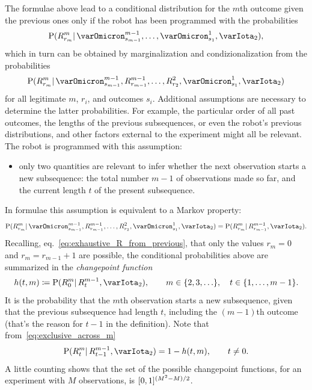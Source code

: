 \documentclass[\ifafour a4paper,12pt,\else a5paper,10pt,\fi%
onecolumn,oneside,article,%
british%
]{memoir}
\theoremstyle{remark}
\theoremstyle{innote}
\newcommand*{\defd}{\coloneqq}
\DeclarePairedDelimiter\clcl{[}{]}
\DeclarePairedDelimiter\set{\{}{\}}
\newcommand*{\p}{\mathrm{P}}%
\renewcommand*{\|}{\mathpunct{|}}
\newcommand*{\eqn}{eq.}%
\newcommand*{\yI}{\varIota}
\newcommand*{\yMc}{\yI_2}
\newcommand*{\yrs}{h}
\begin{document}
The formulae above lead to a conditional distribution for the $m$th outcome
given the previous ones only if the robot has been programmed with the
probabilities
\begin{equation}
  \label{eq:prob_R_conditional_only_data_before}
  \p(R^{m}_{r_{m}} \| \varOmicron^{m-1}_{s_{m-1}},\dotsc, \varOmicron^{1}_{s_{1}}, \yMc),
\end{equation}
which in turn can be obtained by marginalization and condizionalization
from the probabilities
\begin{equation}
  \label{eq:prob_R_conditional_before}
  \p(R^{m}_{r_{m}} \| \varOmicron^{m-1}_{s_{m-1}}, R^{m-1}_{r_{m-1}},\dotsc,
  R^{2}_{r_{2}}, \varOmicron^{1}_{s_{1}}, \yMc)
\end{equation}
for all legitimate $m$, $r_i$, and outcomes $s_i$. Additional assumptions
are necessary to determine the latter probabilities. For example, the
particular order of all past outcomes, the lengths of the previous
subsequences, or even the robot's previous distributions, and other factors
external to the experiment might all be relevant. The robot is programmed
with this assumption:
\begin{itemize}
\item only two quantities are relevant to infer whether the next
  observation starts a new subsequence: the total number $m-1$ of
  observations made so far, and the current length $t$ of the present
  subsequence.
\end{itemize}
In formulae this assumption is equivalent to a Markov property:
\begin{equation}
  \label{eq:prob_R_markov}
  \p(R^{m}_{r_{m}} \| \varOmicron^{m-1}_{s_{m-1}}, R^{m-1}_{r_{m-1}},\dotsc,
  R^{2}_{r_{2}}, \varOmicron^{1}_{s_{1}}, \yMc) =
  \p(R^{m}_{r_{m}} \|  R^{m-1}_{r_{m-1}}, \yMc).
\end{equation}
Recalling, \eqn~\eqref{eq:exhaustive_R_from_previous}, that only the values
$r_{m}=0$ and $r_{m}= r_{m-1}+1$ are possible, the conditional
probabilities above are summarized in the \emph{changepoint function}
\begin{equation}\label{eq:def_changepoint_function}
  \yrs(t,m)  \defd \p(R^{m}_{0} \|  R^{m-1}_{t}, \yMc),
  \qquad m \in\set{2,3,\dotsc}, \quad t\in\set{1,\dotsc,m-1}.
\end{equation}
It is the probability that the $m$th observation starts a new subsequence,
given that the previous subsequence had length $t$, including the $(m-1)$th
outcome (that's the reason for $t-1$ in the definition). Note that
from~\eqref{eq:exclusive_across_m}
\begin{equation}\label{eq:one_minus_h}
  \p(R^{m}_{t} \|  R^{m-1}_{t-1}, \yMc)  = 1-\yrs(t,m),\qquad t\ne 0.
\end{equation}
A little counting shows that the set of the possible changepoint functions,
for an experiment with $M$ observations, is $\clcl{0,1}^{(M^2-M)/2}$.
\end{document}
